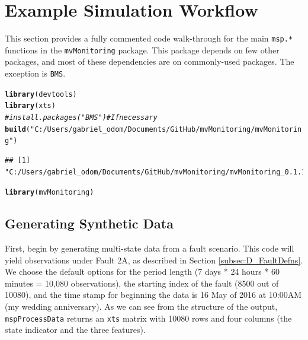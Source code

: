 \documentclass{report}\usepackage[]{graphicx}\usepackage[]{color}
\makeatletter
\newcommand{\hlstr}[1]{\textcolor[rgb]{0.192,0.494,0.8}{#1}}%
\newcommand{\hlcom}[1]{\textcolor[rgb]{0.678,0.584,0.686}{\textit{#1}}}%
\newcommand{\hlstd}[1]{\textcolor[rgb]{0.345,0.345,0.345}{#1}}%
\newcommand{\hlkwd}[1]{\textcolor[rgb]{0.737,0.353,0.396}{\textbf{#1}}}%
\newenvironment{kframe}{%
 \def\at@end@of@kframe{}%
 \ifinner\ifhmode%
  \def\at@end@of@kframe{\end{minipage}}%
  \begin{minipage}{\columnwidth}%
 \fi\fi%
 \def\FrameCommand##1{\hskip\@totalleftmargin \hskip-\fboxsep
 \colorbox{shadecolor}{##1}\hskip-\fboxsep
     \hskip-\linewidth \hskip-\@totalleftmargin \hskip\columnwidth}%
 \MakeFramed {\advance\hsize-\width
   \@totalleftmargin\z@ \linewidth\hsize
   \@setminipage}}%
 {\par\unskip\endMakeFramed%
 \at@end@of@kframe}
\newenvironment{knitrout}{}{} %
\makeatother
\begin{document}

\section{Example Simulation Workflow} \label{sec:D_Workflow}

This section provides a fully commented code walk-through for the main \texttt{msp.*} functions in the \texttt{mvMonitoring} package. This package depends on few other packages, and most of these dependencies are on commonly-used packages. The exception is \texttt{BMS}.
\begin{knitrout}
\color{fgcolor}\begin{kframe}
\begin{alltt}
\hlkwd{library}\hlstd{(devtools)}
\hlkwd{library}\hlstd{(xts)}
\hlcom{# install.packages("BMS") # If necessary}
\hlkwd{build}\hlstd{(}\hlstr{"C:/Users/gabriel_odom/Documents/GitHub/mvMonitoring/mvMonitoring"}\hlstd{)}
\end{alltt}
\begin{verbatim}
## [1] "C:/Users/gabriel_odom/Documents/GitHub/mvMonitoring/mvMonitoring_0.1.1.tar.gz"
\end{verbatim}
\begin{alltt}
\hlkwd{library}\hlstd{(mvMonitoring)}
\end{alltt}
\end{kframe}
\end{knitrout}


\subsection{Generating Synthetic Data}
First, begin by generating multi-state data from a fault scenario. This code will yield observations under Fault 2A, as described in Section \ref{subsec:D_FaultDefns}. We choose the default options for the period length (7 days * 24 hours * 60 minutes = 10,080 observations), the starting index of the fault (8500 out of 10080), and the time stamp for beginning the data is 16 May of 2016 at 10:00AM (my wedding anniversary). As we can see from the structure of the output, \texttt{mspProcessData} returns an \texttt{xts} matrix with 10080 rows and four columns (the state indicator and the three features).
\end{document}
